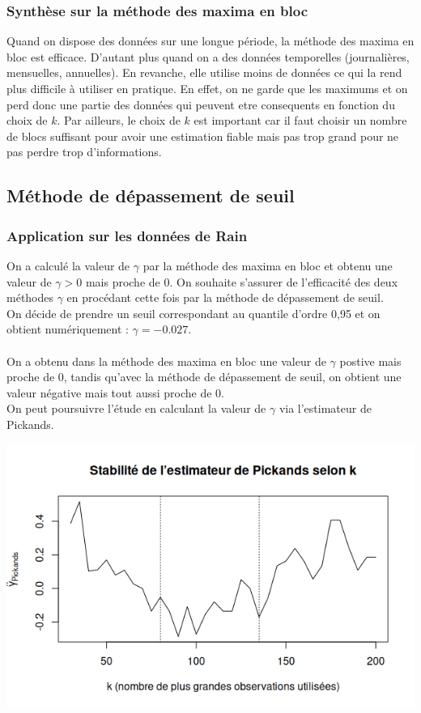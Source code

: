 \documentclass{article}
\theoremstyle{plain}
\theoremstyle{definition}
\theoremstyle{plain}
\begin{document}
\subsubsection{Synthèse sur la méthode des maxima en bloc}

\noindent Quand on dispose des données sur une longue période, la méthode des maxima en bloc est efficace. D'autant plus quand on a des données temporelles (journalières, mensuelles, annuelles).
En revanche, elle utilise moins de données ce qui la rend plus difficile à utiliser en pratique. En effet, on ne garde que les maximums et on perd donc une partie des données qui peuvent etre consequents en fonction du choix de $k$.
Par ailleurs, le choix de $k$ est important car il faut choisir un nombre de blocs suffisant pour avoir une estimation fiable mais pas trop grand pour ne pas perdre trop d'informations.

\subsection{Méthode de dépassement de seuil}


\subsubsection{Application sur les données de Rain}

\noindent On a calculé la valeur de $\gamma$ par la méthode des maxima en bloc et obtenu une valeur de $\gamma > 0 $ mais proche de 0. On souhaite s'assurer de l'efficacité des deux méthodes $\gamma$
en procédant cette fois par la méthode de dépassement de seuil.
\\
On décide de prendre un seuil correspondant au quantile d’ordre 0,95 et on obtient numériquement : $\gamma  = -0.027$.
\\
\\
On a obtenu dans la méthode des maxima en bloc une valeur de $\gamma$ postive mais proche de 0,
tandis qu'avec la méthode de dépassement de seuil, on obtient une valeur négative mais tout aussi proche de 0.
\\
On peut poursuivre l'étude en calculant la valeur de $\gamma$ via l'estimateur de Pickands.

\begin{center}
	\includegraphics[scale=0.57]{./images/pickandsrain.png} 
\end{center}
\end{document}
